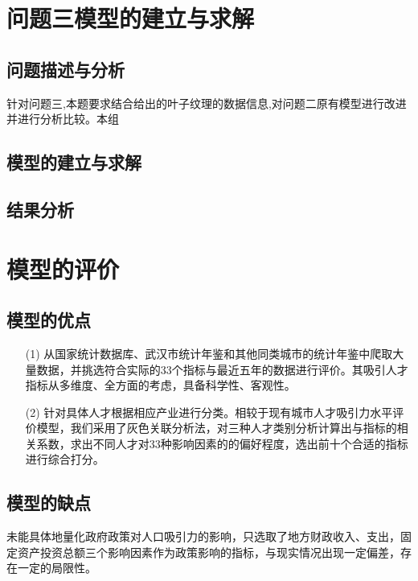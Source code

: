 \documentclass{whutmod}
\begin{document}
	


	\section{问题三模型的建立与求解}
    \subsection{问题描述与分析}
    针对问题三,本题要求结合给出的叶子纹理的数据信息,对问题二原有模型进行改进并进行分析比较。本组
    
	
		
    \subsection{模型的建立与求解}
    
    \subsection{结果分析}
	
	
	\section{模型的评价}
	\subsection{模型的优点}
	\begin{itemize}
		\item [(1)] 从国家统计数据库、武汉市统计年鉴和其他同类城市的统计年鉴中爬取大量数据，并挑选符合实际的33个指标与最近五年的数据进行评价。其吸引人才指标从多维度、全方面的考虑，具备科学性、客观性。
		\item [(2)]针对具体人才根据相应产业进行分类。相较于现有城市人才吸引力水平评价模型，我们采用了灰色关联分析法，对三种人才类别分析计算出与指标的相关系数，求出不同人才对33种影响因素的的偏好程度，选出前十个合适的指标进行综合打分。
	\end{itemize}

	
	\subsection{模型的缺点}
    未能具体地量化政府政策对人口吸引力的影响，只选取了地方财政收入、支出，固定资产投资总额三个影响因素作为政策影响的指标，与现实情况出现一定偏差，存在一定的局限性。

    
    
	\newpage	%
	\nocite{*}		%

	
\end{document}

